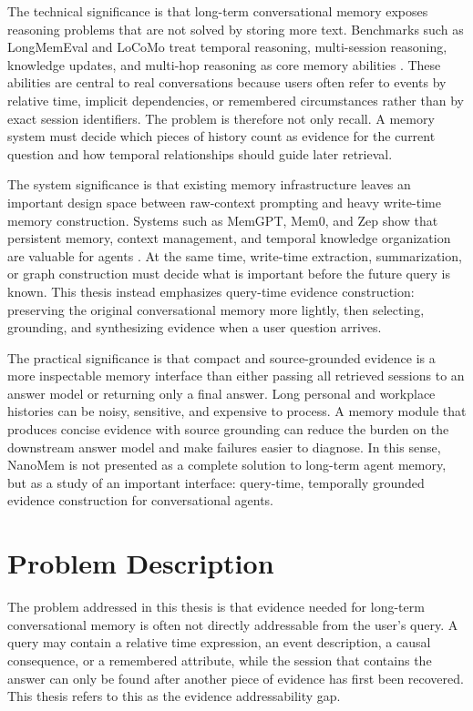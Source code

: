The technical significance is that long-term conversational memory exposes
reasoning problems that are not solved by storing more text. Benchmarks such as
LongMemEval and LoCoMo treat temporal reasoning, multi-session reasoning,
knowledge updates, and multi-hop reasoning as core memory abilities
\cite{wu2024longmemeval,maharana2024locomo}. These abilities are central to
real conversations because users often refer to events by relative time,
implicit dependencies, or remembered circumstances rather than by exact session
identifiers. The problem is therefore not only recall. A memory system must
decide which pieces of history count as evidence for the current question and
how temporal relationships should guide later retrieval.

The system significance is that existing memory infrastructure leaves an
important design space between raw-context prompting and heavy write-time memory
construction. Systems such as MemGPT, Mem0, and Zep show that persistent memory,
context management, and temporal knowledge organization are valuable for agents
\cite{packer2023memgpt,chhikara2025mem0,rasmussen2025zep}. At the same time,
write-time extraction, summarization, or graph construction must decide what is
important before the future query is known. This thesis instead emphasizes
query-time evidence construction: preserving the original conversational memory
more lightly, then selecting, grounding, and synthesizing evidence when a user
question arrives.

The practical significance is that compact and source-grounded evidence is a
more inspectable memory interface than either passing all retrieved sessions to
an answer model or returning only a final answer. Long personal and workplace
histories can be noisy, sensitive, and expensive to process. A memory module
that produces concise evidence with source grounding can reduce the burden on
the downstream answer model and make failures easier to diagnose. In this sense,
NanoMem is not presented as a complete solution to long-term agent memory, but
as a study of an important interface: query-time, temporally grounded evidence
construction for conversational agents.

\section{Problem Description}
\label{sec:intro-problem-description}

The problem addressed in this thesis is that evidence needed for long-term
conversational memory is often not directly addressable from the user's query.
A query may contain a relative time expression, an event description, a causal
consequence, or a remembered attribute, while the session that contains the
answer can only be found after another piece of evidence has first been
recovered. This thesis refers to this as the evidence addressability gap.

